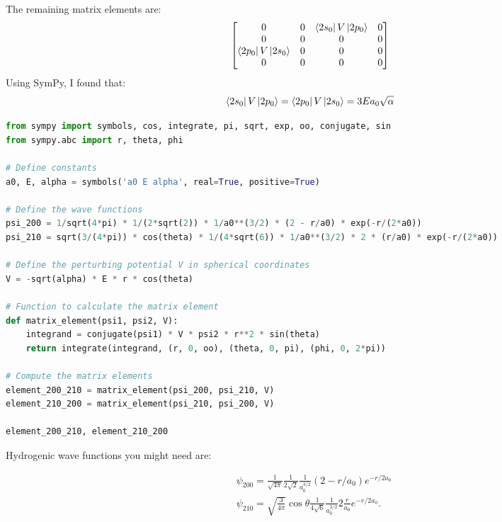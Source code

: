 \documentclass[12pt]{article}
\begin{document}
\subsubsection{}
The remaining matrix elements are:
\begin{equation}
  \begin{bmatrix}
    0 & 0 & \bra{2s_{0}}V\ket{2p_{0}} & 0 \\
    0 & 0 & 0 & 0 \\
    \bra{2p_{0}}V\ket{2s_{0}} & 0 & 0 & 0 \\
    0 & 0 & 0 & 0
  \end{bmatrix}
\end{equation}
Using SymPy, I found that:
\begin{equation}
  \bra{2s_{0}}V\ket{2p_{0}} = \bra{2p_{0}}V\ket{2s_{0}} = 3Ea_0 \sqrt{\alpha }
\end{equation}
\begin{lstlisting}[language=Python]
from sympy import symbols, cos, integrate, pi, sqrt, exp, oo, conjugate, sin
from sympy.abc import r, theta, phi

# Define constants
a0, E, alpha = symbols('a0 E alpha', real=True, positive=True)

# Define the wave functions
psi_200 = 1/sqrt(4*pi) * 1/(2*sqrt(2)) * 1/a0**(3/2) * (2 - r/a0) * exp(-r/(2*a0))
psi_210 = sqrt(3/(4*pi)) * cos(theta) * 1/(4*sqrt(6)) * 1/a0**(3/2) * 2 * (r/a0) * exp(-r/(2*a0))

# Define the perturbing potential V in spherical coordinates
V = -sqrt(alpha) * E * r * cos(theta)

# Function to calculate the matrix element
def matrix_element(psi1, psi2, V):
    integrand = conjugate(psi1) * V * psi2 * r**2 * sin(theta)
    return integrate(integrand, (r, 0, oo), (theta, 0, pi), (phi, 0, 2*pi))

# Compute the matrix elements
element_200_210 = matrix_element(psi_200, psi_210, V)
element_210_200 = matrix_element(psi_210, psi_200, V)

element_200_210, element_210_200


\end{lstlisting}

Hydrogenic wave functions you might need are:

$$
\begin{aligned}
& \psi_{200}=\frac{1}{\sqrt{4 \pi}} \frac{1}{2 \sqrt{2}} \frac{1}{a_{0}^{3 / 2}}\left(2-r / a_{0}\right) e^{-r / 2 a_{0}} \\
& \psi_{210}=\sqrt{\frac{3}{4 \pi}} \cos \theta \frac{1}{4 \sqrt{6}} \frac{1}{a_{0}^{3 / 2}} 2 \frac{r}{a_{0}} e^{-r / 2 a_{0}} .
\end{aligned}
$$
\end{document}
